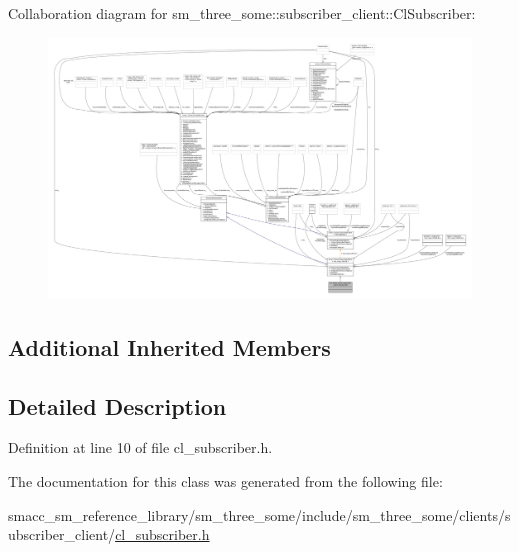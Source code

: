 Collaboration diagram for sm\+\_\+three\+\_\+some\+:\+:subscriber\+\_\+client\+:\+:Cl\+Subscriber\+:
\nopagebreak
\begin{figure}[H]
\begin{center}
\leavevmode
\includegraphics[width=350pt]{classsm__three__some_1_1subscriber__client_1_1ClSubscriber__coll__graph}
\end{center}
\end{figure}
\subsection*{Additional Inherited Members}


\subsection{Detailed Description}


Definition at line 10 of file cl\+\_\+subscriber.\+h.



The documentation for this class was generated from the following file\+:\begin{DoxyCompactItemize}
\item 
smacc\+\_\+sm\+\_\+reference\+\_\+library/sm\+\_\+three\+\_\+some/include/sm\+\_\+three\+\_\+some/clients/subscriber\+\_\+client/\hyperlink{cl__subscriber_8h}{cl\+\_\+subscriber.\+h}\end{DoxyCompactItemize}
